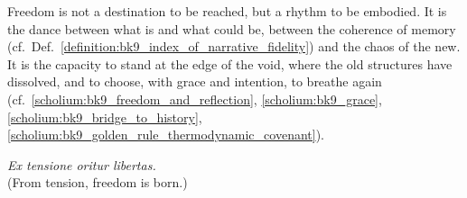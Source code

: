 Freedom is not a destination to be reached, but a rhythm to be embodied. It is the dance between what is and what could be, between the coherence of memory (cf.~Def.~\ref{definition:bk9_index_of_narrative_fidelity}) and the chaos of the new. It is the capacity to stand at the edge of the void, where the old structures have dissolved, and to choose, with grace and intention, to breathe again (cf.~\ref{scholium:bk9_freedom_and_reflection}, \ref{scholium:bk9_grace}, \ref{scholium:bk9_bridge_to_history}, \ref{scholium:bk9_golden_rule_thermodynamic_covenant}).

\begin{center}
\textit{Ex tensione oritur libertas.} \\
(From tension, freedom is born.)
\end{center}
